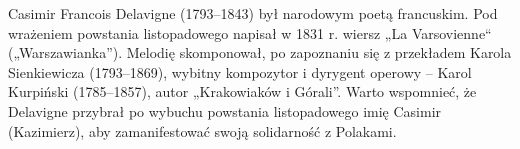 \begin{info}Casimir Francois Delavigne (1793–1843) był narodowym poetą francuskim. Pod wrażeniem powstania listopadowego napisał w 1831 r. wiersz „La Varsovienne“ („Warszawianka”). Melodię skomponował, po zapoznaniu się z przekładem Karola Sienkiewicza (1793–1869), wybitny kompozytor i dyrygent operowy – Karol Kurpiński (1785–1857), autor „Krakowiaków i Górali”. Warto wspomnieć, że Delavigne przybrał po wybuchu powstania listopadowego imię Casimir (Kazimierz), aby zamanifestować swoją solidarność z Polakami.\end{info}

